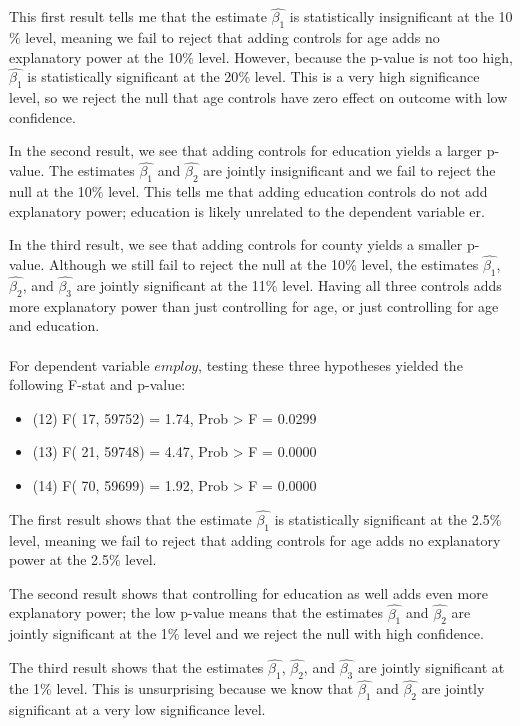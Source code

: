 \documentclass[a4paper]{article}
\begin{document}
This first result tells me that the estimate $\hat{\beta_1}$ is statistically insignificant at the 10$\%$ level, meaning we fail to reject that adding controls for age adds no explanatory power at the 10$\%$ level. However, because the p-value is not too high, $\hat{\beta_1}$ is statistically significant at the 20$\%$ level. This is a very high significance level, so we reject the null that age controls have zero effect on outcome with low confidence. 

In the second result, we see that adding controls for education yields a larger p-value. The estimates $\hat{\beta_1}$ and $\hat{\beta_2}$ are jointly insignificant and we fail to reject the null at the 10$\%$ level.
This tells me that adding education controls do not add explanatory power; education is likely unrelated to the dependent variable er. 

In the third result, we see that adding controls for county yields a smaller p-value. Although we still fail to reject the null at the 10$\%$ level, the estimates $\hat{\beta_1}$, $\hat{\beta_2}$, and $\hat{\beta_3}$ are jointly significant at the 11$\%$ level. Having all three controls adds more explanatory power than just controlling for age, or just controlling for age and education.
\\
\\
For dependent variable $employ$, testing these three hypotheses yielded the following F-stat and p-value:
\begin{itemize}
    \item (12) F( 17, 59752) = 1.74, Prob > F = 0.0299
    \item (13) F( 21, 59748) = 4.47, Prob > F = 0.0000
    \item (14) F( 70, 59699) = 1.92, Prob > F = 0.0000
\end{itemize}
The first result shows that the estimate $\hat{\beta_1}$ is statistically significant at the 2.5$\%$ level, meaning we fail to reject that adding controls for age adds no explanatory power at the 2.5$\%$ level.

The second result shows that controlling for education as well adds even more explanatory power; the low p-value means that the estimates $\hat{\beta_1}$ and $\hat{\beta_2}$ are jointly significant at the 1$\%$ level and we reject the null with high confidence. 

The third result shows that the estimates $\hat{\beta_1}$, $\hat{\beta_2}$, and $\hat{\beta_3}$ are jointly significant at the 1$\%$ level. This is unsurprising because we know that $\hat{\beta_1}$ and $\hat{\beta_2}$ are jointly significant at a very low significance level.
\end{document}
